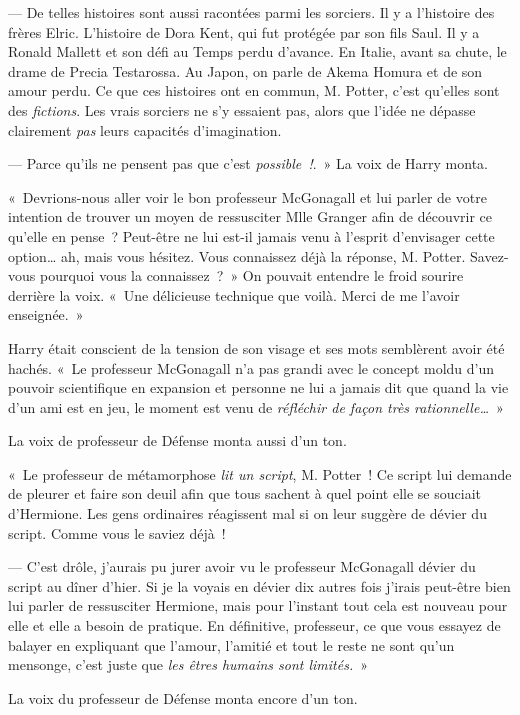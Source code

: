 --- De telles histoires sont aussi racontées parmi les sorciers. Il y a l'histoire des frères Elric. L'histoire de Dora Kent, qui fut protégée par son fils Saul. Il y a Ronald Mallett et son défi au Temps perdu d'avance. En Italie, avant sa chute, le drame de Precia Testarossa. Au Japon, on parle de Akema Homura et de son amour perdu. Ce que ces histoires ont en commun, M. Potter, c'est qu'elles sont des \emph{fictions}. Les vrais sorciers ne s'y essaient pas, alors que l'idée ne dépasse clairement \emph{pas} leurs capacités d'imagination.

--- Parce qu'ils ne pensent pas que c'est \emph{possible~!}.~» La voix de Harry monta.

«~Devrions-nous aller voir le bon professeur McGonagall et lui parler de votre intention de trouver un moyen de ressusciter Mlle Granger afin de découvrir ce qu'elle en pense~? Peut-être ne lui est-il jamais venu à l'esprit d'envisager cette option… ah, mais vous hésitez. Vous connaissez déjà la réponse, M. Potter. Savez-vous pourquoi vous la connaissez~?~» On pouvait entendre le froid sourire derrière la voix. «~Une délicieuse technique que voilà. Merci de me l'avoir enseignée.~»

Harry était conscient de la tension de son visage et ses mots semblèrent avoir été hachés. «~Le professeur McGonagall n'a pas grandi avec le concept moldu d'un pouvoir scientifique en expansion et personne ne lui a jamais dit que quand la vie d'un ami est en jeu, le moment est venu de \emph{réfléchir de façon très rationnelle…}~»

La voix de professeur de Défense monta aussi d'un ton.

«~Le professeur de métamorphose \emph{lit un script}, M. Potter~! Ce script lui demande de pleurer et faire son deuil afin que tous sachent à quel point elle se souciait d'Hermione. Les gens ordinaires réagissent mal si on leur suggère de dévier du script. Comme vous le saviez déjà~!

--- C'est drôle, j'aurais pu jurer avoir vu le professeur McGonagall dévier du script au dîner d'hier. Si je la voyais en dévier dix autres fois j'irais peut-être bien lui parler de ressusciter Hermione, mais pour l'instant tout cela est nouveau pour elle et elle a besoin de pratique. En définitive, professeur, ce que vous essayez de balayer en expliquant que l'amour, l'amitié et tout le reste ne sont qu'un mensonge, c'est juste que \emph{les êtres humains sont limités.}~»

La voix du professeur de Défense monta encore d'un ton.

